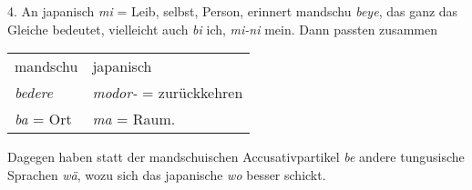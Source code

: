 {4. An japanisch \textit{mi} = Leib, selbst, Person, erinnert mandschu \textit{beye}, das ganz das Gleiche bedeutet, vielleicht auch \textit{bi} ich, \textit{mi-ni} mein. Dann passten zusammen

\label{sp.291}

\begin{center}
\begin{tabular}{ l@{\hskip 48pt} l }
mandschu & japanisch \\
\textit{bedere} & \textit{modor-} = zurückkehren \\
\textit{ba} = Ort & \textit{ma} = Raum.
\end{tabular}
\end{center}

\noindent Dagegen haben statt der mandschuischen Accusativpartikel \textit{be} andere tungusische Sprachen \textit{wä}, wozu sich das japanische \textit{wo} besser schickt.

}

